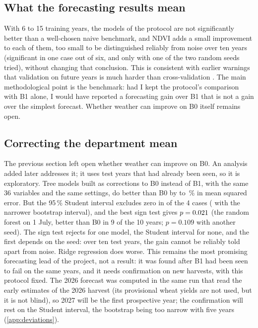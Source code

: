 \subsection{What the forecasting results mean}

With 6 to 15 training years, the models of the protocol are not significantly better than a well-chosen naive benchmark, and NDVI adds a small improvement to each of them, too small to be distinguished reliably from noise over ten years (significant in one case out of six, and only with one of the two random seeds tried), without changing that conclusion. This is consistent with earlier warnings that validation on future years is much harder than cross-validation \parencite{gouache2015,morales2023}. The main methodological point is the benchmark: had I kept the protocol's comparison with B1 alone, I would have reported a forecasting gain over B1 that is not a gain over the simplest forecast. Whether weather can improve on B0 itself remains open.

\subsection{Correcting the department mean}
\label{subsec:forecast-v12}

The previous section left open whether weather can improve on B0. An analysis added later addresses it; it uses test years that had already been seen, so it is exploratory. Tree models built as corrections to B0 instead of B1, with the same 36 variables and the same settings, do better than B0 by \BzeroTreeMin{} to \BzeroTreeMax\,\% in mean squared error. But the 95\,\% Student interval excludes zero in \BzeroTreeSig{} of the 4 cases (\BzeroTreeSigBoot{} with the narrower bootstrap interval), and the best sign test gives $p = 0.021$ (the random forest on 1 July, better than B0 in 9 of the 10 years; $p = 0.109$ with another seed). The sign test rejects for one model, the Student interval for none, and the first depends on the seed: over ten test years, the gain cannot be reliably told apart from noise. Ridge regression does worse. This remains the most promising forecasting lead of the project, not a result: it was found after B1 had been seen to fail on the same years, and it needs confirmation on new harvests, with this protocol fixed. The 2026 forecast was computed in the same run that read the early estimates of the 2026 harvest (its provisional wheat yields are not used, but it is not blind), so 2027 will be the first prospective year; the confirmation will rest on the Student interval, the bootstrap being too narrow with five years (\cref{app:deviations}).
